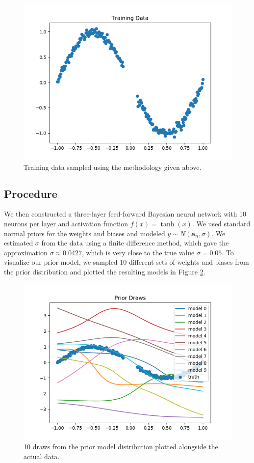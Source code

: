\documentclass[
    preprint,
    12pt,
    letterpaper,
    longbibliography,
    nofootinbib,
    amsmath,
    amssymb,
    amsfonts,
]{revtex4-1}
\begin{document}
\begin{figure}
\includegraphics{Figure_1.png}
\caption{Training data sampled using the methodology given above.}
\label{fig:1}
\end{figure}

\subsection{Procedure}

We then constructed a three-layer feed-forward Bayesian neural network with 10 neurons per layer and activation function $f(x) = \tanh(x)$. We used standard normal priors for the weights and biases and modeled $y \sim N(\bm a_n, \sigma)$. We estimated $\sigma$ from the data using a finite difference method, which gave the approximation $\sigma \approx 0.0427$, which is very close to the true value $\sigma = 0.05$. To visualize our prior model, we sampled 10 different sets of weights and biases from the prior distribution and plotted the resulting models in Figure \ref{fig:2}.

\begin{figure}
\includegraphics{Figure_2.png}
\caption{10 draws from the prior model distribution plotted alongside the actual data.}
\label{fig:2}
\end{figure}
\end{document}
